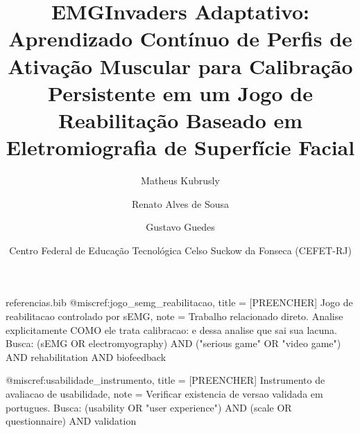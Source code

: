 \begin{filecontents*}[overwrite]{referencias.bib}
@misc{ref:jogo_semg_reabilitacao,
  title = {[PREENCHER] Jogo de reabilitacao controlado por sEMG},
  note  = {Trabalho relacionado direto. Analise explicitamente COMO ele
           trata calibracao: e dessa analise que sai sua lacuna.
           Busca: (sEMG OR electromyography) AND ("serious game" OR
           "video game") AND rehabilitation AND biofeedback}
}

@misc{ref:usabilidade_instrumento,
  title = {[PREENCHER] Instrumento de avaliacao de usabilidade},
  note  = {Verificar existencia de versao validada em portugues.
           Busca: (usability OR "user experience") AND (scale OR
           questionnaire) AND validation}
}

\end{filecontents*}

\documentclass[12pt,a4paper]{article}

\usepackage[utf8]{inputenc}
\usepackage[T1]{fontenc}
\usepackage[brazil]{babel}
\usepackage{amsmath,amssymb}
\usepackage{graphicx}
\usepackage{booktabs}
\usepackage{url}
\usepackage{indentfirst}
\usepackage[hidelinks]{hyperref}
\usepackage{tikz}
\usepackage{pgfgantt}
\usetikzlibrary{shapes.geometric, arrows.meta, positioning, calc}

\title{\textbf{EMGInvaders Adaptativo: Aprendizado Contínuo de Perfis de
Ativação Muscular para Calibração Persistente em um Jogo de
Reabilitação Baseado em Eletromiografia de Superfície Facial}}

\author{Matheus Kubrusly \and Renato Alves de Sousa \and Gustavo Guedes}

\date{Centro Federal de Educação Tecnológica Celso Suckow da Fonseca
(CEFET-RJ)}


\maketitle

